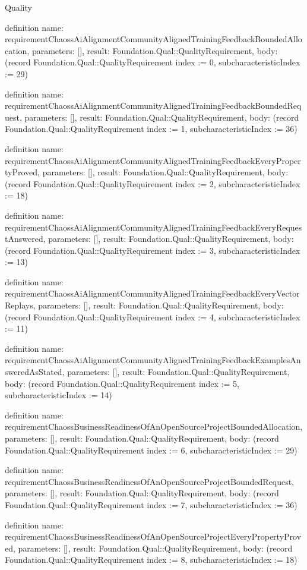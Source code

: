 \begin{lexlean}{Quality}
\begin{semanticmodule}
definition{
  name: requirementChaossAiAlignmentCommunityAlignedTrainingFeedbackBoundedAllocation,
  parameters: [],
  result: Foundation.Qual::QualityRequirement,
  body: (record Foundation.Qual::QualityRequirement {index := 0, subcharacteristicIndex := 29})
}

definition{
  name: requirementChaossAiAlignmentCommunityAlignedTrainingFeedbackBoundedRequest,
  parameters: [],
  result: Foundation.Qual::QualityRequirement,
  body: (record Foundation.Qual::QualityRequirement {index := 1, subcharacteristicIndex := 36})
}

definition{
  name: requirementChaossAiAlignmentCommunityAlignedTrainingFeedbackEveryPropertyProved,
  parameters: [],
  result: Foundation.Qual::QualityRequirement,
  body: (record Foundation.Qual::QualityRequirement {index := 2, subcharacteristicIndex := 18})
}

definition{
  name: requirementChaossAiAlignmentCommunityAlignedTrainingFeedbackEveryRequestAnswered,
  parameters: [],
  result: Foundation.Qual::QualityRequirement,
  body: (record Foundation.Qual::QualityRequirement {index := 3, subcharacteristicIndex := 13})
}

definition{
  name: requirementChaossAiAlignmentCommunityAlignedTrainingFeedbackEveryVectorReplays,
  parameters: [],
  result: Foundation.Qual::QualityRequirement,
  body: (record Foundation.Qual::QualityRequirement {index := 4, subcharacteristicIndex := 11})
}

definition{
  name: requirementChaossAiAlignmentCommunityAlignedTrainingFeedbackExamplesAnsweredAsStated,
  parameters: [],
  result: Foundation.Qual::QualityRequirement,
  body: (record Foundation.Qual::QualityRequirement {index := 5, subcharacteristicIndex := 14})
}

definition{
  name: requirementChaossBusinessReadinessOfAnOpenSourceProjectBoundedAllocation,
  parameters: [],
  result: Foundation.Qual::QualityRequirement,
  body: (record Foundation.Qual::QualityRequirement {index := 6, subcharacteristicIndex := 29})
}

definition{
  name: requirementChaossBusinessReadinessOfAnOpenSourceProjectBoundedRequest,
  parameters: [],
  result: Foundation.Qual::QualityRequirement,
  body: (record Foundation.Qual::QualityRequirement {index := 7, subcharacteristicIndex := 36})
}

definition{
  name: requirementChaossBusinessReadinessOfAnOpenSourceProjectEveryPropertyProved,
  parameters: [],
  result: Foundation.Qual::QualityRequirement,
  body: (record Foundation.Qual::QualityRequirement {index := 8, subcharacteristicIndex := 18})
}


\end{semanticmodule}
\end{lexlean}
